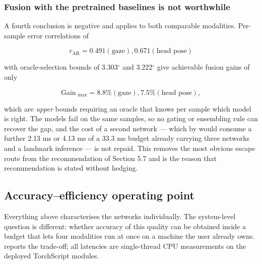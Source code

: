 \subsubsection{Fusion with the pretrained baselines is not worthwhile}

A fourth conclusion is negative and applies to both comparable modalities. Per-sample error correlations of

\begin{equation}
\label{eq:293}
r_{\mathrm{AR}} = 0.491 (\text{gaze}) , 0.671 (\text{head pose})
\end{equation}

with oracle-selection bounds  of 3.303$^{\circ}$ and 3.222$^{\circ}$ give achievable fusion gains of only

\begin{equation}
\label{eq:294}
\text{Gain}\;_{\mathrm{max}} = 8.8 \% (\text{gaze}) , 7.5 \% (\text{head pose}) ,
\end{equation}

which are \emph{upper} bounds requiring an oracle that knows per sample which model is right. The models fail on the same samples, so no gating or ensembling rule can recover the gap, and the cost of a second network --- which by  would consume a further 2.13 ms or 4.13 ms of a 33.3 ms budget already carrying three networks and a landmark inference --- is not repaid. This removes the most obvious escape route from the recommendation of Section 5.7 and is the reason that recommendation is stated without hedging.

\FloatBarrier

\subsection{Accuracy--efficiency operating point}

Everything above characterises the networks individually. The system-level question is different: whether accuracy of this quality can be obtained inside a budget that lets four modalities run at once on a machine the user already owns.  reports the trade-off; all latencies are single-thread CPU measurements on the deployed TorchScript modules.

